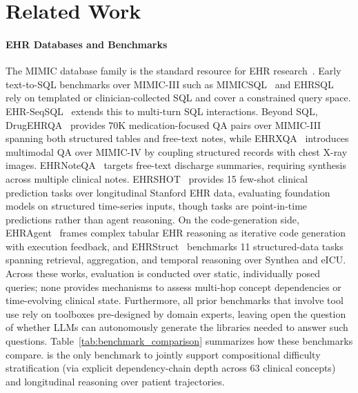 \section{Related Work}

\paragraph{EHR Databases and Benchmarks}
The MIMIC database family is the standard resource for EHR research~\cite{johnson2020mimic, johnson2018mimic}. Early text-to-SQL benchmarks over MIMIC-III such as MIMICSQL~\cite{wang2020treqs} and EHRSQL~\cite{lee2022ehrsql} rely on templated or clinician-collected SQL and cover a constrained query space. EHR-SeqSQL~\cite{bae2024ehrseqsql} extends this to multi-turn SQL interactions. Beyond SQL, DrugEHRQA~\cite{bardhan-etal-2022-drugehrqa} provides 70K medication-focused QA pairs over MIMIC-III spanning both structured tables and free-text notes, while EHRXQA~\cite{bae2023ehrxqa} introduces multimodal QA over MIMIC-IV by coupling structured records with chest X-ray images. EHRNoteQA~\cite{kim2024ehrnoteqa} targets free-text discharge summaries, requiring synthesis across multiple clinical notes. EHRSHOT~\cite{wornow2023ehrshot} provides 15 few-shot clinical prediction tasks over longitudinal Stanford EHR data, evaluating foundation models on structured time-series inputs, though tasks are point-in-time predictions rather than agent reasoning. On the code-generation side, EHRAgent~\cite{shi2024ehragent} frames complex tabular EHR reasoning as iterative code generation with execution feedback, and EHRStruct~\cite{zhang2025ehrstruct} benchmarks 11 structured-data tasks spanning retrieval, aggregation, and temporal reasoning over Synthea and eICU. Across these works, evaluation is conducted over static, individually posed queries; none provides mechanisms to assess multi-hop concept dependencies or time-evolving clinical state. Furthermore, all prior benchmarks that involve tool use rely on toolboxes pre-designed by domain experts, leaving open the question of whether LLMs can autonomously generate the libraries needed to answer such questions. Table~\ref{tab:benchmark_comparison} summarizes how these benchmarks compare. \ours{} is the only benchmark to jointly support compositional difficulty stratification (via explicit dependency-chain depth across 63 clinical concepts) and longitudinal reasoning over patient trajectories.

